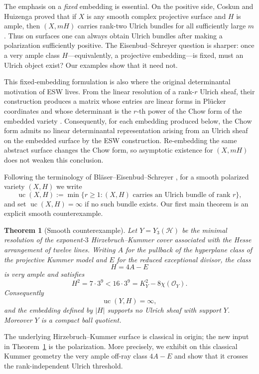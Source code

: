 \documentclass[11pt]{article}
\newtheorem{theorem}{Theorem}[section]
\newcommand{\OO}{\mathcal O}
\newcommand{\cH}{\mathcal H}
\newcommand{\uc}{\operatorname{uc}}
\begin{document}
The emphasis on a \emph{fixed} embedding is essential.  On the positive side,
Coskun and Huizenga proved that if $X$ is any smooth complex projective surface
and $H$ is ample, then $(X,mH)$ carries rank-two Ulrich bundles for all
sufficiently large $m$ \cite[Theorem~1.2]{CoskunHuizenga}.  Thus on surfaces one
can always obtain Ulrich bundles after making a polarization sufficiently
positive.  The Eisenbud--Schreyer question is sharper: once a very ample class
$H$---equivalently, a projective embedding---is fixed, must an Ulrich object
exist?  Our examples show that it need not.

This fixed-embedding formulation is also where the original determinantal
motivation of ESW lives.  From the linear resolution of a rank-$r$ Ulrich sheaf,
their construction produces a matrix whose entries are linear forms in Pl\"ucker
coordinates and whose determinant is the $r$-th power of the Chow form of the
embedded variety \cite[Section~3]{ESW}.  Consequently, for each embedding produced
below, the Chow form admits no linear determinantal representation arising from an
Ulrich sheaf on the embedded surface by the ESW construction.  Re-embedding the same abstract surface changes
the Chow form, so asymptotic existence for $(X,mH)$ does not weaken this conclusion.

Following the terminology of Bl\"aser--Eisenbud--Schreyer \cite{BESUlrichComplexity}, for a smooth polarized variety $(X,H)$ we write
\[
 \uc(X,H):=\min\{r\ge1:\text{$(X,H)$ carries an Ulrich bundle of rank $r$}\},
\]
and set $\uc(X,H)=\infty$ if no such bundle exists.  Our first main theorem is
an explicit smooth counterexample.

\begin{theorem}[Smooth counterexample]\label{thm:intro-counterexample}
Let $Y=Y_3(\cH)$ be the minimal resolution of the exponent-$3$
Hirzebruch--Kummer cover associated with the Hesse arrangement of twelve lines.
Writing $A$ for the pullback of the hyperplane class of the projective Kummer
model and $E$ for the reduced exceptional divisor, the class
\[
        H=4A-E
\]
is very ample and satisfies
\[
        H^2=7\cdot3^9
        <16\cdot3^9
        =K_Y^2-8\chi(\OO_Y).
\]
Consequently
\[
        \uc(Y,H)=\infty,
\]
and the embedding defined by $|H|$ supports no Ulrich sheaf with support $Y$.
Moreover $Y$ is a compact ball quotient.
\end{theorem}

The underlying Hirzebruch--Kummer surface is classical in origin; the new input
in Theorem~\ref{thm:intro-counterexample} is the polarization.  More precisely,
we exhibit on this classical Kummer geometry the very ample off-ray class
$4A-E$ and show that it crosses the rank-independent Ulrich threshold.
\end{document}
